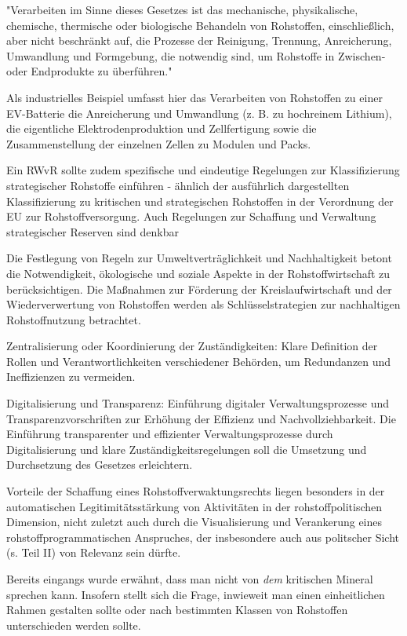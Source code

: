 \documentclass[12pt,a4paper,oneside]{book} %
\begin{document}
"Verarbeiten im Sinne dieses Gesetzes ist das mechanische, physikalische, chemische, thermische oder biologische Behandeln von Rohstoffen, einschließlich, aber nicht beschränkt auf, die Prozesse der Reinigung, Trennung, Anreicherung, Umwandlung und Formgebung, die notwendig sind, um Rohstoffe in Zwischen- oder Endprodukte zu überführen."

Als industrielles Beispiel umfasst hier das Verarbeiten von Rohstoffen zu einer EV-Batterie die Anreicherung und Umwandlung (z. B. zu hochreinem Lithium), die eigentliche Elektrodenproduktion und Zellfertigung sowie die Zusammenstellung der einzelnen Zellen zu Modulen und Packs.

Ein RWvR sollte zudem spezifische und eindeutige Regelungen zur Klassifizierung strategischer Rohstoffe einführen - ähnlich der ausführlich dargestellten Klassifizierung zu kritischen und strategischen Rohstoffen in der Verordnung der EU zur Rohstoffversorgung. Auch Regelungen zur Schaffung und Verwaltung strategischer Reserven sind denkbar  %

Die Festlegung von Regeln zur Umweltverträglichkeit und Nachhaltigkeit betont die Notwendigkeit, ökologische und soziale Aspekte in der Rohstoffwirtschaft zu berücksichtigen.
Die Maßnahmen zur Förderung der Kreislaufwirtschaft und der Wiederverwertung von Rohstoffen werden als Schlüsselstrategien zur nachhaltigen Rohstoffnutzung betrachtet.

Zentralisierung oder Koordinierung der Zuständigkeiten: Klare Definition der Rollen und Verantwortlichkeiten verschiedener Behörden, um Redundanzen und Ineffizienzen zu vermeiden.

Digitalisierung und Transparenz: Einführung digitaler Verwaltungsprozesse und Transparenzvorschriften zur Erhöhung der Effizienz und Nachvollziehbarkeit.
Die Einführung transparenter und effizienter Verwaltungsprozesse durch Digitalisierung und klare Zuständigkeitsregelungen soll die Umsetzung und Durchsetzung des Gesetzes erleichtern.

Vorteile der Schaffung eines Rohstoffverwaktungsrechts liegen besonders in der automatischen Legitimitätsstärkung von Aktivitäten in der rohstoffpolitischen Dimension, nicht zuletzt auch durch die Visualisierung und Verankerung eines rohstoffprogrammatischen Anspruches, der insbesondere auch aus politscher Sicht (s. Teil II) von Relevanz sein dürfte.

Bereits eingangs wurde erwähnt, dass man nicht von \textit{dem} kritischen Mineral sprechen kann. Insofern stellt sich die Frage, inwieweit man einen einheitlichen Rahmen gestalten sollte oder nach bestimmten Klassen von Rohstoffen unterschieden werden sollte.
\end{document}
